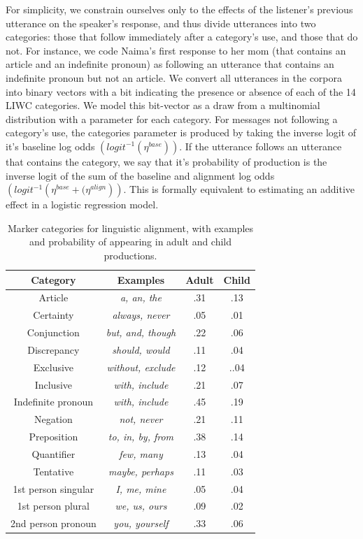 \documentclass[10pt,letterpaper]{article}
\begin{document}
For simplicity, we constrain ourselves only to the effects of the listener's previous utterance on the speaker's response, and thus divide utterances into two categories: those that follow immediately after a category's use, and those that do not. For instance, we code Naima's first response to her mom (that contains an article and an indefinite pronoun) as following an utterance that contains an indefinite pronoun but not an article. We convert all utterances in the corpora into binary vectors with a bit indicating the presence or absence of each of the 14 LIWC categories. We model this bit-vector as a draw from a multinomial distribution with a parameter for each category. For messages not following a category's use, the categories parameter is produced by taking the inverse logit of it's baseline log odds $\left(logit^{-1}\left(\eta^{base}\right)\right)$. If the utterance follows an utterance that contains the category, we say that it's probability of production is the inverse logit of the sum of the baseline and alignment log odds $\left(logit^{-1}\left(\eta^{base} + (\eta^{align}\right)\right)$. This is formally equivalent to estimating an additive effect in a logistic regression model.

\begin{table}[tb]
\centering
\begin{tabular}{|c|c|c|c|} \hline
Category & Examples & Adult & Child\\ \hline
Article & \textit{a, an, the} & .31 & .13 \\
Certainty  & \textit{always, never} & .05 & .01 \\
Conjunction  & \textit{but, and, though} & .22 & .06\\
Discrepancy  & \textit{should, would} & .11 & .04 \\
Exclusive  & \textit{without, exclude} & .12 & ..04\\
Inclusive  & \textit{with, include} & .21 & .07\\
Indefinite pronoun & \textit{with, include} & .45 & .19\\
Negation   & \textit{not, never} & .21 & .11\\
Preposition& \textit{to, in, by, from}  & .38 & .14\\
Quantifier   & \textit{few, many} & .13 & .04\\
Tentative & \textit{maybe, perhaps} & .11 & .03\\
1st person singular  & \textit{I, me, mine} & .05 & .04\\
1st person plural & \textit{we, us, ours} & .09 & .02\\
2nd person pronoun   & \textit{you, yourself} & .33 & .06\\
\hline
\end{tabular}
\caption{Marker categories for linguistic alignment, with examples and probability of appearing in adult and child productions.}\label{tab:LIWC}
\end{table}
\end{document}
